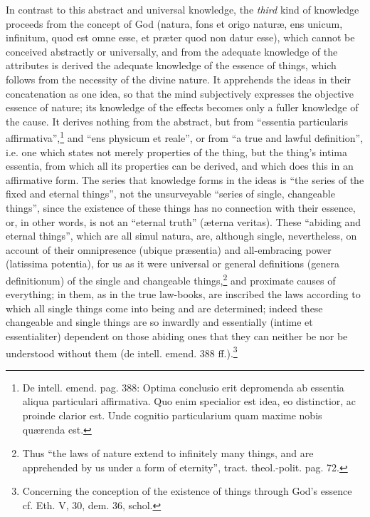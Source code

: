 \documentclass[12pt,a4paper,openany]{book}
\newcommand{\opage}[1]{\marginnote{\footnotesize\textit{[#1]}}}
\begin{document}
In contrast to this abstract and universal knowledge, the
\emph{third} kind of knowledge proceeds from the concept of God (natura, fons
et origo naturæ, ens unicum, infinitum, quod est omne esse, et
præter quod non datur esse), which cannot be conceived abstractly or
universally, and from the adequate
\opage{102}\setcounter{footnote}{0}knowledge of the attributes is derived the adequate knowledge of
the essence of things, which follows from the necessity of the divine nature.
It apprehends the ideas in their concatenation as one idea, so
that the mind subjectively expresses the objective essence of nature; its
knowledge of the effects becomes only a fuller knowledge of
the cause. It derives nothing from the abstract, but from ``essentia
particularis affirmativa'',\footnote{De intell. emend. pag. 388:
Optima conclusio erit depromenda ab essentia aliqua particulari
affirmativa. Quo enim specialior est idea, eo distinctior, ac
proinde clarior est. Unde cognitio particularium quam maxime nobis
quærenda est.} and ``ens physicum et reale'', or from ``a true and
lawful definition'', i.e. one which states not merely properties
of the thing, but the thing's intima essentia, from which all its
properties can be derived, and which does this in an affirmative form.
The series that knowledge forms in the ideas is ``the series of the fixed and
eternal things'', not the unsurveyable ``series of single, changeable
things'', since the existence of these things has no connection with their
essence, or, in other words, is not an ``eternal truth'' (æterna
veritas). These ``abiding and eternal things'', which are all simul natura,
are, although single, nevertheless, on account of their omnipresence
(ubique præsentia) and all-embracing power (latissima potentia), for
us as it were universal or general definitions (genera
definitionum) of the single and changeable
things,\footnote{Thus ``the laws of nature extend to infinitely
many things, and are apprehended by us under a form of eternity'', tract.
theol.-polit. pag. 72.} and proximate causes of everything; in them, as
in the true law-books, are inscribed the laws according to which all single
things come into being and are determined; indeed these changeable and single things
are so inwardly and essentially (intime et essentialiter) dependent
on those abiding ones that they can neither be nor be understood without them
(de intell. emend. 388 ff.).\footnote{Concerning the conception of
the existence of things through God's essence cf. Eth. V, 30, dem. 36, schol.}
\end{document}
